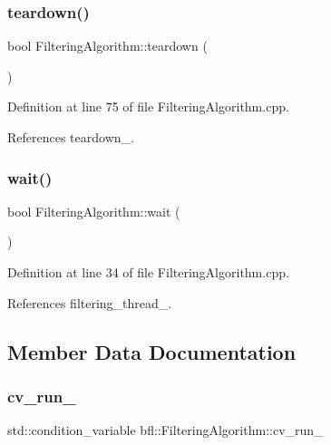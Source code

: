\subsubsection{\texorpdfstring{teardown()}{teardown()}}
{\footnotesize\ttfamily bool Filtering\+Algorithm\+::teardown (\begin{DoxyParamCaption}{ }\end{DoxyParamCaption})}



Definition at line 75 of file Filtering\+Algorithm.\+cpp.



References teardown\+\_\+.

\mbox{\label{classbfl_1_1FilteringAlgorithm_a40372c24fa050eb0274371172df0a244}} 
\subsubsection{\texorpdfstring{wait()}{wait()}}
{\footnotesize\ttfamily bool Filtering\+Algorithm\+::wait (\begin{DoxyParamCaption}{ }\end{DoxyParamCaption})}



Definition at line 34 of file Filtering\+Algorithm.\+cpp.



References filtering\+\_\+thread\+\_\+.



\subsection{Member Data Documentation}
\mbox{\label{classbfl_1_1FilteringAlgorithm_ae92a6d82ce18c35516f42a7109c931af}} 
\subsubsection{\texorpdfstring{cv\+\_\+run\+\_\+}{cv\_run\_}}
{\footnotesize\ttfamily std\+::condition\+\_\+variable bfl\+::\+Filtering\+Algorithm\+::cv\+\_\+run\+\_\+\hspace{0.3cm}{\ttfamily [private]}}



